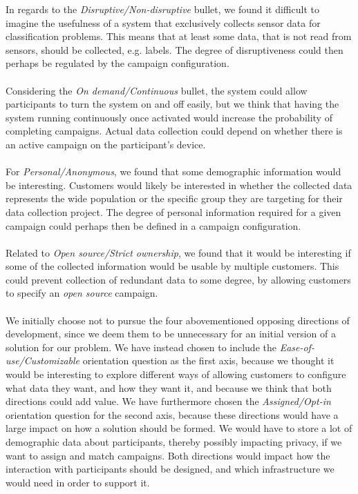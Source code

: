 In regards to the \emph{Disruptive/Non-disruptive} bullet, we found it difficult to imagine the usefulness of a system that exclusively collects sensor data for classification problems. This means that at least some data, that is not read from sensors, should be collected, e.g. labels. The degree of disruptiveness could then perhaps be regulated by the campaign configuration. 
\\\\
Considering the \emph{On demand/Continuous} bullet, the system could allow participants to turn the system on and off easily, but we think that having the system running continuously once activated would increase the probability of completing campaigns. Actual data collection could depend on whether there is an active campaign on the participant's device. 
\\\\
For \emph{Personal/Anonymous}, we found that some demographic information would be interesting. Customers would likely be interested in whether the collected data represents the wide population or the specific group they are targeting for their data collection project. The degree of personal information required for a given campaign could perhaps then be defined in a campaign configuration. 
\\\\
Related to \emph{Open source/Strict ownership}, we found that it would be interesting if some of the collected information would be usable by multiple customers. This could prevent collection of redundant data to some degree, by allowing customers to specify an \emph{open source} campaign.
\\\\
We initially choose not to pursue the four abovementioned opposing directions of development, since we deem them to be unnecessary for an initial version of a solution for our problem. 
We have instead chosen to include the \emph{Ease-of-use/Customizable} orientation question as the first axis, because we thought it would be interesting to explore different ways of allowing customers to configure what data they want, and how they want it, and because we think that both directions could add value. 
We have furthermore chosen the \emph{Assigned/Opt-in} orientation question for the second axis, because these directions would have a large impact on how a solution should be formed. We would have to store a lot of demographic data about participants, thereby possibly impacting privacy, if we want to assign and match campaigns. Both directions would impact how the interaction with participants should be designed, and which infrastructure we would need in order to support it.
